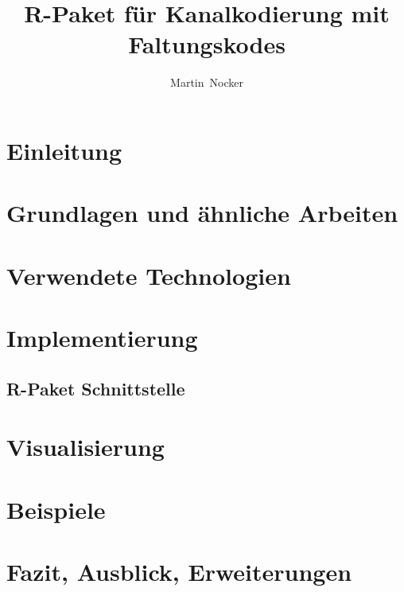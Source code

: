 \documentclass[germanthesis]{thesis-style}
\author{Martin~Nocker}
\title{R-Paket für Kanalkodierung mit Faltungskodes}
\begin{document}
\maketitle

\begin{abstract}

\end{abstract}

\tableofcontents
{}

\chapter{Einleitung}
\label{kapitel:einleitung}


\chapter{Grundlagen und ähnliche Arbeiten}
\label{kapitel:grundlagen}

\chapter{Verwendete Technologien}
\label{kapitel:technologien}


\chapter{Implementierung}
\label{kapitel:implementierung}


\section{R-Paket Schnittstelle}
\label{kapitel:interface}


\chapter{Visualisierung}
\label{kapitel:visualisierung}


\chapter{Beispiele}
\label{kapitel:beispiele}

\chapter{Fazit, Ausblick, Erweiterungen}
\label{kapitel:fazit}

\cleardoublepage%

\listofabbreviations
\clearpage

\listoffigures
\clearpage

\listoftables
\clearpage

\lstlistoflistings
\clearpage

\printbibliography
\end{document}
